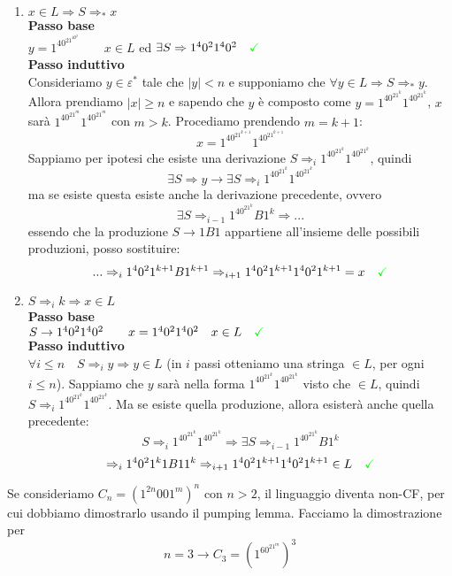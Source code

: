 \documentclass[a4paper,oneside]{scrbook}
\newcommand{\greenmark}{\quad \textcolor{green}{\checkmark}}
\begin{document}
\begin{enumerate}
	\item $x\in L \Rightarrow S \Rightarrow_* x $\\
	\textbf{Passo base}\\
	$y=1^40^21^40^2 \qquad x \in L$ ed $\exists S\Rightarrow 1^40^21^40^2 \greenmark $\\
	\textbf{Passo induttivo}\\
	Consideriamo $y \in \varepsilon^*$ tale che $|y|<n$ e supponiamo che $\forall y \in L \Rightarrow S \Rightarrow_* y$.\\
	Allora prendiamo $|x|\geq n$ e sapendo che $y$ è composto come $y=1^40^21^k1^40^21^k$, $x$ sarà $1^40^21^m1^40^21^m$ con $m>k$. Procediamo prendendo $m=k+1$:
	$$ x=1^40^21^{k+1}1^40^21^{k+1}$$
	Sappiamo per ipotesi che esiste una derivazione  $S\Rightarrow_i 1^40^21^k1^40^21^k$, quindi
	$$\exists S \Rightarrow y \rightarrow \exists S \Rightarrow_i 1^40^21^k1^40^21^k$$
	ma se esiste questa esiste anche la derivazione precedente, ovvero
	$$\exists S \Rightarrow_{i-1} 1^40^21^{k}B1^{k} \Rightarrow ...$$
	essendo che la produzione $S\rightarrow 1B1$ appartiene all'insieme delle possibili produzioni, posso sostituire:
	$$... \Rightarrow_i  1^40^21^{k+1}B1^{k+1} \Rightarrow_{i+1}  1^40^21^{k+1}1^40^21^{k+1} = x \greenmark$$
	
	\item $ S \Rightarrow_i k \Rightarrow x \in L$\\
	\textbf{Passo base}\\
	$S\rightarrow 1^40^21^40^2 \qquad x=1^40^21^40^2 \quad x \in L \greenmark $\\
	\textbf{Passo induttivo}\\
	$\forall i \leq n \quad S \Rightarrow_i y \Rightarrow y \in L $ (in $i$ passi otteniamo una stringa $\in L$, per ogni $i\leq n$).
	Sappiamo che $y$ sarà nella forma $1^40^21^k1^40^21^k$ visto che $\in L$, quindi $S \Rightarrow_i 1^40^21^k1^40^21^k$.
	Ma se esiste quella produzione, allora esisterà anche quella precedente:
	$$S \Rightarrow_i 1^40^21^k1^40^21^k \Rightarrow \exists S \Rightarrow_{i-1} 1^40^21^kB1^k$$
	$$\Rightarrow_i 1^40^21^k1B11^k \Rightarrow_{i+1} 1^40^21^{k+1}1^40^21^{k+1} \in L \greenmark$$
\end{enumerate}
Se consideriamo $C_n=(1^{2n}001^m)^n$ con $n>2$, il linguaggio diventa non-CF, per cui dobbiamo dimostrarlo usando il pumping lemma. Facciamo la dimostrazione per $$n=3 \rightarrow C_3=(1^60^21^m)^3$$
\end{document}
